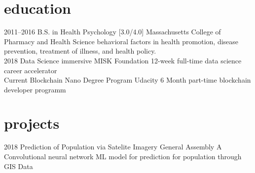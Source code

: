 \documentclass[]{cv-style}          %
\begin{document}

\section{education}

\begin{entrylist}
\entry
{2011--2016}
{B.S. {\normalfont in Health Psychology [3.0/4.0]}}
{Massachusetts College of Pharmacy and Health Science}
{behavioral factors in health promotion, 
disease prevention, treatment of illness, and health policy.}
{\vspace{-0.3cm}}
\\
\entry
{2018}
{Data Science immersive}
{MISK Foundation}
{12-week full-time data science career accelerator}
{\vspace{-0.3cm}}
\\
\entry
{Current}
{Blockchain Nano Degree Program}
{Udacity}
{6 Month part-time blockchain developer programm}
{\vspace{-0.3cm}}
\end{entrylist}

\section{projects}

\begin{entrylist}
\entry
{2018}
{Prediction of Population via Satelite Imagery}
{General Assembly}
{A Convolutional neural network ML model for prediction for population through GIS Data}

\end{entrylist}
\end{document}
